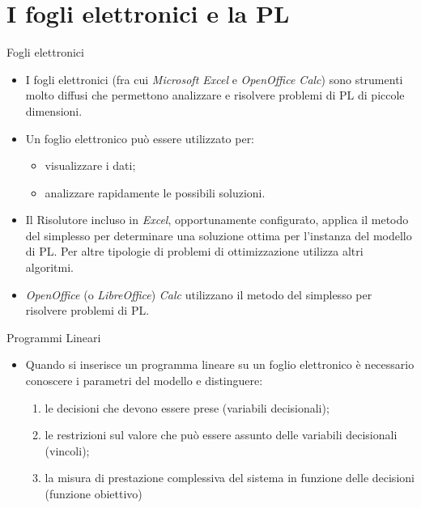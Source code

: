 \documentclass{beamer}
\title{\titolo}
\author{Gionata Massi}
\date{\today}
\begin{document}
\section{I fogli elettronici e la PL}

\begin{frame}{Fogli elettronici}
\begin{itemize}
\item I fogli elettronici (fra cui \emph{Microsoft Excel} e \emph{OpenOffice Calc}) sono
strumenti molto diffusi che permettono analizzare e risolvere
problemi di PL di piccole dimensioni.

\item Un foglio elettronico pu\`o essere utilizzato per:
\begin{itemize}
	\item visualizzare i dati;
	\item analizzare rapidamente le possibili soluzioni.
\end{itemize}

\item Il Risolutore incluso in \emph{Excel}, opportunamente configurato,
applica il metodo del simplesso per determinare una soluzione ottima
per l'instanza del modello di PL. Per altre tipologie di problemi di
ottimizzazione utilizza altri algoritmi.

\item \emph{OpenOffice} (o \emph{LibreOffice}) \emph{Calc} utilizzano il metodo del
simplesso per risolvere problemi di PL.
\end{itemize}
\end{frame}

\begin{frame}{Programmi Lineari}
\begin{itemize}
\item Quando si inserisce un programma lineare su un foglio elettronico
\`e necessario conoscere i parametri del modello e distinguere:
\begin{enumerate}
\item le decisioni che devono essere prese (\alert{variabili decisionali});
\item le restrizioni sul valore che pu\`o essere assunto delle variabili
	decisionali (\alert{vincoli});
\item la misura di prestazione complessiva del sistema in funzione delle decisioni (\alert{funzione obiettivo})
\end{enumerate}
\end{itemize}
\end{frame}
\end{document}
